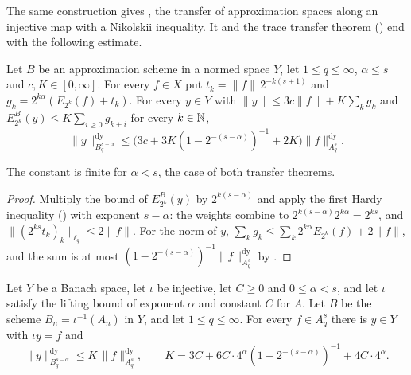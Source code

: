 The same construction gives , the transfer of approximation spaces
along an injective map with a Nikolskii inequality. It and the trace transfer theorem
() end with the following estimate.

\begin{lemma}
\label{lem:transfer-estimate}
\leanok
{}
Let $B$ be an approximation scheme in a normed space $Y$, let $1 \leq q \leq \infty$,
$\alpha \leq s$ and $c, K \in [0, \infty]$. For every $f \in X$ put
$t_k = \|f\| \, 2^{-k(s+1)}$ and $g_k = 2^{k\alpha} (E_{2^k}(f) + t_k)$. For every $y \in Y$
with $\|y\| \leq 3c\|f\| + K \sum_k g_k$ and $E^B_{2^k}(y) \leq K \sum_{i \geq 0} g_{k+i}$ for
every $k \in \mathbb{N}$,
\[
  \|y\|^{\mathrm{dy}}_{B^{s-\alpha}_q} \leq
  \bigl(3c + 3K (1 - 2^{-(s-\alpha)})^{-1} + 2K\bigr) \|f\|^{\mathrm{dy}}_{A^s_q} .
\]
\end{lemma}

The constant is finite for $\alpha < s$, the case of both transfer theorems.

\begin{proof}
\leanok
{}
Multiply the bound of $E^B_{2^k}(y)$ by $2^{k(s-\alpha)}$ and apply the first Hardy inequality
() with exponent $s - \alpha$: the weights combine to
$2^{k(s-\alpha)} 2^{k\alpha} = 2^{ks}$, and $\|(2^{ks} t_k)_k\|_{\ell_q} \leq 2\|f\|$. For the
norm of $y$, $\sum_k g_k \leq \sum_k 2^{k\alpha} E_{2^k}(f) + 2\|f\|$, and the sum is at most
$(1 - 2^{-(s-\alpha)})^{-1} \|f\|^{\mathrm{dy}}_{A^s_q}$ by .
\end{proof}

\begin{theorem}
\label{thm:nikolskii-transfer}
\leanok
{}
Let $Y$ be a Banach space, let $\iota$ be injective, let $C \geq 0$ and $0 \leq \alpha < s$,
and let $\iota$ satisfy the lifting bound of exponent $\alpha$ and constant $C$ for $A$. Let
$B$ be the scheme $B_n = \iota^{-1}(A_n)$ in $Y$, and let $1 \leq q \leq \infty$. For every
$f \in A^s_q$ there is $y \in Y$ with $\iota y = f$ and
\[
  \|y\|^{\mathrm{dy}}_{B^{s-\alpha}_q} \leq K \, \|f\|^{\mathrm{dy}}_{A^s_q},
  \qquad
  K = 3C + 6C \cdot 4^\alpha (1 - 2^{-(s-\alpha)})^{-1} + 4C \cdot 4^\alpha .
\]
\end{theorem}

